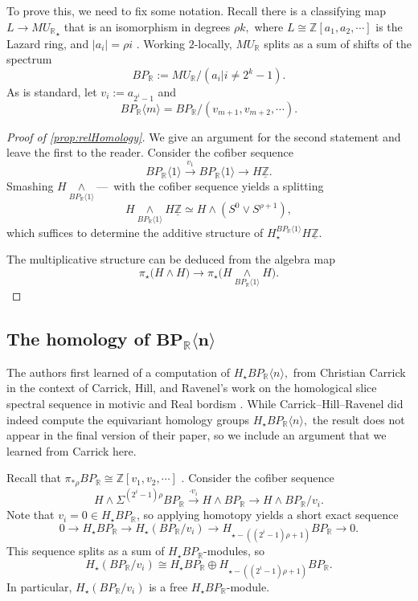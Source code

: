 \documentclass{amsart}
\theoremstyle{plain}
\numberwithin{equation}{section}
\numberwithin{figure}{section}
\newcommand{\mR}{{\mathbb R}}
\newcommand{\mZ}{{\mathbb Z}}
\newcommand{\umZ}{\underline{\mZ}}
\newcommand{\0}{\langle 0 \rangle }
\newcommand{\one}{\langle 1 \rangle }
\begin{document}
To prove this, we need to fix some notation. Recall there is a classifying map $L \to {MU_\mR}_\star$ that is an isomorphism in degrees $\rho k,$ where $L \cong \mZ[a_1, a_2, \cdots]$ is the Lazard ring, and $\vert a_i \vert = \rho i$ \cite[Theorem~2.28]{HuKriz2001}. Working $2$-locally, $MU_\mR$ splits as a sum of shifts of the spectrum
\[
BP_\mR := MU_\mR / (a_i | i \neq 2^k -1).
\]
As is standard, let $v_i := a_{2^i - 1}$ and
\[
BP_\mR \langle m \rangle = BP_\mR / (v_{m + 1}, v_{m + 2}, \cdots ).
\]

\begin{proof}[Proof of \cref{prop:relHomology}]
We give an argument for the second statement and leave the first to the reader. Consider the cofiber sequence 
\[
 BP_\mR \one \xrightarrow{{v}_1} BP_\mR \one \xrightarrow{} H \umZ.
 \]
Smashing $H  \underset{BP_\mR \one}{\wedge} \text{---} \,$ with the cofiber sequence yields a splitting
 \[
 H \underset{BP_\mathbb{R}\one}{\wedge} H \umZ \simeq H  \wedge (S^0 \vee S^{\rho + 1}),
 \]
 which suffices to determine the additive structure of $H_{\star}^{BP_\mR \one}H\umZ$. 
 
 The multiplicative structure can be deduced from the algebra map 
 \[
 \pi_{\star}\big(H \wedge H \big) \to \pi_{\star}\big(H \underset{BP_\mR \one}{\wedge} H \big).
 \]
\end{proof}

\subsection{The homology of $\mathbf{BP_\mR \langle n \rangle}$}  The authors first learned of a computation of $H_\star BP_\mathbb{R} \langle n \rangle,$ 
from Christian Carrick in the context of Carrick, Hill, and Ravenel's work on the homological slice spectral sequence in motivic and Real bordism \cite{CarrickHillRavenel24}. While Carrick--Hill--Ravenel did indeed compute the equivariant homology groups $H_\star BP_\mathbb{R} \langle n \rangle,$ the result does not appear in the final version of their paper, so we include an argument that we learned from  Carrick here.

Recall that $\pi_{*\rho}BP_\mR \cong \mathbb{Z}[{v}_1, {v}_2, \cdots]$ \cite[Theorem~6.18]{HuKriz2001}. 
Consider the cofiber sequence
\[
H \wedge \Sigma^{(2^i-1)\rho} BP_\mR \xrightarrow{\cdot{v}_i} H \wedge BP_\mR \xrightarrow{} H \wedge BP_\mR / {v}_i.
\]
Note that ${v}_i = 0 \in H_\star BP_\mR$, so applying homotopy yields a short exact sequence
\[
0 \to H_\star BP_\mR \to H_\star (BP_\mR / {v}_i) \to H_{\star - ((2^i-1)\rho + 1)} BP_\mR \to 0
.\]
This sequence splits as a sum of $H_\star BP_\mR$-modules, so
\[
H_\star (BP_\mR / {v}_i) \cong H_\star BP_\mR \oplus H_{\star - ((2^i - 1)\rho + 1)} BP_\mR.
\]
In particular, $H_\star (BP_\mR / {v}_i)$ is a free $H_\star BP_\mR$-module. 
\end{document}
